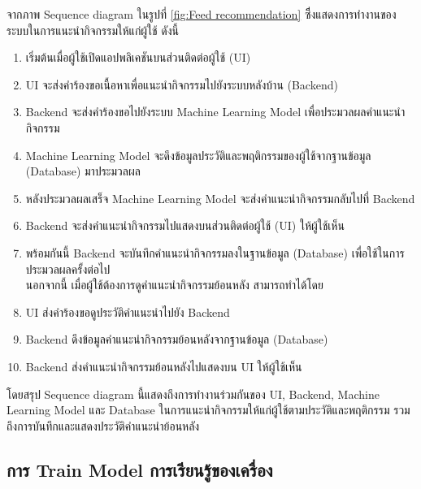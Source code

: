 \documentclass[14pt,oneside,openright,a4paper]{cpe-thai-project}
\begin{document}
  จากภาพ Sequence diagram ในรูปที่ \ref{fig:Feed recommendation} ซึึ่งแสดงการทำงานของระบบในการแนะนำกิจกรรมให้แก่ผู้ใช้ ดังนี้
  \begin{enumerate}
    \item เริ่มต้นเมื่อผู้ใช้เปิดแอปพลิเคชันบนส่วนติดต่อผู้ใช้ (UI)
    \item UI จะส่งคำร้องขอเนื้อหาเพื่อแนะนำกิจกรรมไปยังระบบหลังบ้าน (Backend)
    \item Backend จะส่งคำร้องขอไปยังระบบ Machine Learning Model เพื่อประมวลผลคำแนะนำกิจกรรม
    \item Machine Learning Model จะดึงข้อมูลประวัติและพฤติกรรมของผู้ใช้จากฐานข้อมูล (Database) มาประมวลผล
    \item หลังประมวลผลเสร็จ Machine Learning Model จะส่งคำแนะนำกิจกรรมกลับไปที่ Backend
    \item Backend จะส่งคำแนะนำกิจกรรมไปแสดงบนส่วนติดต่อผู้ใช้ (UI) ให้ผู้ใช้เห็น
    \item พร้อมกันนี้ Backend จะบันทึกคำแนะนำกิจกรรมลงในฐานข้อมูล (Database) เพื่อใช้ในการประมวลผลครั้งต่อไป \\
    นอกจากนี้ เมื่อผู้ใช้ต้องการดูคำแนะนำกิจกรรมย้อนหลัง สามารถทำได้โดย
    \item UI ส่งคำร้องขอดูประวัติคำแนะนำไปยัง Backend
    \item Backend ดึงข้อมูลคำแนะนำกิจกรรมย้อนหลังจากฐานข้อมูล (Database)
    \item Backend ส่งคำแนะนำกิจกรรมย้อนหลังไปแสดงบน UI ให้ผู้ใช้เห็น
  \end{enumerate}
  โดยสรุป Sequence diagram นี้แสดงถึงการทำงานร่วมกันของ UI, Backend, Machine Learning Model และ Database ในการแนะนำกิจกรรมให้แก่ผู้ใช้ตามประวัติและพฤติกรรม รวมถึงการบันทึกและแสดงประวัติคำแนะนำย้อนหลัง

\newpage

\subsection{การ Train Model การเรียนรู้ของเครื่อง}
\end{document}
